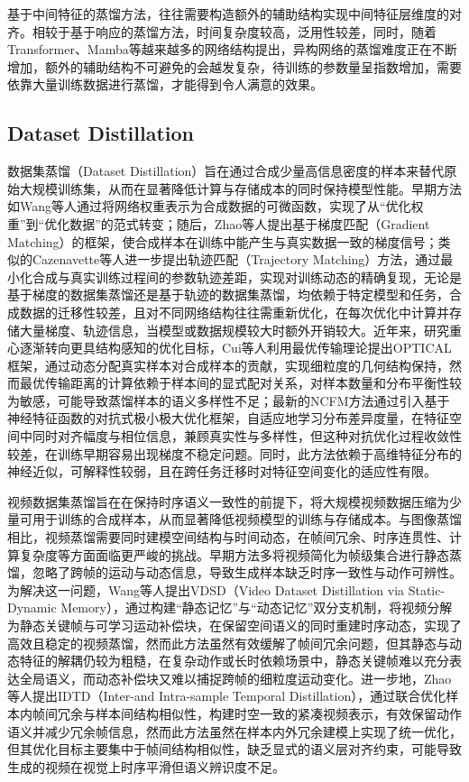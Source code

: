 \documentclass[10.5pt,letterpaper]{article}
\begin{document}
	基于中间特征的蒸馏方法，往往需要构造额外的辅助结构实现中间特征层维度的对齐。相较于基于响应的蒸馏方法，时间复杂度较高，泛用性较差，同时，随着Transformer\cite{vaswani-nips2017-attention}、Mamba\cite{gu-arxiv2023-mamba}等越来越多的网络结构提出，异构网络的蒸馏难度正在不断增加，额外的辅助结构不可避免的会越发复杂，待训练的参数量呈指数增加，需要依靠大量训练数据进行蒸馏，才能得到令人满意的效果。
\subsection{Dataset Distillation}
数据集蒸馏（Dataset Distillation）旨在通过合成少量高信息密度的样本来替代原始大规模训练集，从而在显著降低计算与存储成本的同时保持模型性能。早期方法如Wang等人\cite{wang-iclr2019-dataset}通过将网络权重表示为合成数据的可微函数，实现了从“优化权重”到“优化数据”的范式转变；随后，Zhao等人\cite{zhao-iclr2021-dcwgm}提出基于梯度匹配（Gradient Matching）的框架，使合成样本在训练中能产生与真实数据一致的梯度信号；类似的Cazenavette等人\cite{cazenavette-cvpr2022-ddmtt}进一步提出轨迹匹配（Trajectory Matching）方法，通过最小化合成与真实训练过程间的参数轨迹差距，实现对训练动态的精确复现，无论是基于梯度的数据集蒸馏还是基于轨迹的数据集蒸馏，均依赖于特定模型和任务，合成数据的迁移性较差，且对不同网络结构往往需重新优化，在每次优化中计算并存储大量梯度、轨迹信息，当模型或数据规模较大时额外开销较大。近年来，研究重心逐渐转向更具结构感知的优化目标，Cui等人\cite{cui-cvpr2025-optical}利用最优传输理论提出OPTICAL框架，通过动态分配真实样本对合成样本的贡献，实现细粒度的几何结构保持，然而最优传输距离的计算依赖于样本间的显式配对关系，对样本数量和分布平衡性较为敏感，可能导致蒸馏样本的语义多样性不足；最新的NCFM方法\cite{wang-cvpr2025-ncfm}通过引入基于神经特征函数的对抗式极小极大优化框架，自适应地学习分布差异度量，在特征空间中同时对齐幅度与相位信息，兼顾真实性与多样性，但这种对抗优化过程收敛性较差，在训练早期容易出现梯度不稳定问题。同时，此方法依赖于高维特征分布的神经近似，可解释性较弱，且在跨任务迁移时对特征空间变化的适应性有限。

视频数据集蒸馏旨在在保持时序语义一致性的前提下，将大规模视频数据压缩为少量可用于训练的合成样本，从而显著降低视频模型的训练与存储成本。与图像蒸馏相比，视频蒸馏需要同时建模空间结构与时间动态，在帧间冗余、时序连贯性、计算复杂度等方面面临更严峻的挑战。早期方法多将视频简化为帧级集合进行静态蒸馏，忽略了跨帧的运动与动态信息，导致生成样本缺乏时序一致性与动作可辨性。为解决这一问题，Wang等人\cite{wang-cvpr2024-vdsd}提出VDSD（Video Dataset Distillation via Static-Dynamic Memory），通过构建“静态记忆”与“动态记忆”双分支机制，将视频分解为静态关键帧与可学习运动补偿块，在保留空间语义的同时重建时序动态，实现了高效且稳定的视频蒸馏，然而此方法虽然有效缓解了帧间冗余问题，但其静态与动态特征的解耦仍较为粗糙，在复杂动作或长时依赖场景中，静态关键帧难以充分表达全局语义，而动态补偿块又难以捕捉跨帧的细粒度运动变化。进一步地，Zhao等人\cite{zhao-arxiv2024-idtd}提出IDTD（Inter-and Intra-sample Temporal Distillation），通过联合优化样本内帧间冗余与样本间结构相似性，构建时空一致的紧凑视频表示，有效保留动作语义并减少冗余帧信息，然而此方法虽然在样本内外冗余建模上实现了统一优化，但其优化目标主要集中于帧间结构相似性，缺乏显式的语义层对齐约束，可能导致生成的视频在视觉上时序平滑但语义辨识度不足。
\end{document}
